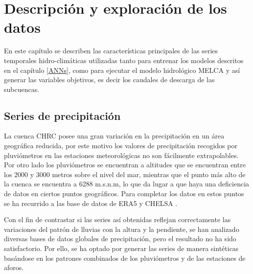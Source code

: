 \chapter{Descripción y exploración de los datos}
\label{datos}


En este capítulo se describen las características principales de las series temporales hidro-climáticas utilizadas 
tanto para entrenar los modelos descritos en el capítulo \ref{ANNs}, 
como para ejecutar el modelo hidrológico MELCA y así generar las variables objetivos, es decir los caudales de descarga
 de las subcuencas.

\section{Series de precipitación}

La cuenca CHRC  posee una gran variación en la precipitación en un área geográfica reducida,
por este motivo los valores de precipitación recogidos por pluviómetros en las estaciones meteorológicas 
no son fácilmente extrapolables. Por otro lado los pluviómetros se encuentran 
a altitudes que se encuentran entre los 2000 y 3000 metros sobre el nivel del mar, mientras que el punto más alto de 
la cuenca se encuentra a  6288 m.s.n.m, lo que da lugar a que haya una deficiencia de datos en ciertos puntos geográficos. 
Para completar los datos en estos puntos se ha recurrido a las base de datos de ERA5 \cite{ERA5} y CHELSA \cite{CHELSA}.

Con el fin de contrastar si las series así obtenidas reflejan 
correctamente las variaciones del patrón de lluvias con la altura y la pendiente, 
se han analizado diversas bases de datos globales de precipitación, pero el resultado no ha sido 
satisfactorio.  Por ello, se ha optado por generar las series de manera sintéticas basándose 
en los patrones combinados de los pluviómetros y de las estaciones de aforos.




